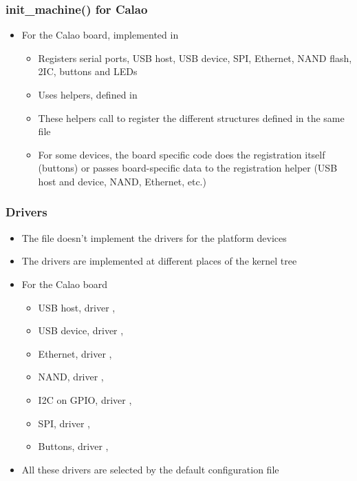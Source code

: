 \begin{frame}
  \frametitle{init\_machine() for Calao}
  \begin{itemize}
  \item For the Calao board, implemented in 
    \begin{itemize}
    \item Registers serial ports, USB host, USB device, SPI, Ethernet,
      NAND flash, 2IC, buttons and LEDs
    \item Uses  helpers, defined in
    \item These helpers call  to
      register the different  structures defined
      in the same file
    \item For some devices, the board specific code does the
      registration itself (buttons) or passes board-specific data to
      the registration helper (USB host and device, NAND, Ethernet,
      etc.)
    \end{itemize}
  \end{itemize}
\end{frame}

\begin{frame}
  \frametitle{Drivers}
  \begin{itemize}
  \item The  file doesn't implement the
    drivers for the platform devices
  \item The drivers are implemented at different places of the kernel
    tree
  \item For the Calao board
    \begin{itemize}
    \item USB host, driver ,
    \item USB device, driver ,
    \item Ethernet, driver , 
    \item NAND, driver ,
    \item I2C on GPIO, driver ,
    \item SPI, driver , 
    \item Buttons, driver ,
    \end{itemize}
  \item All these drivers are selected by the default configuration
    file
  \end{itemize}
\end{frame}

